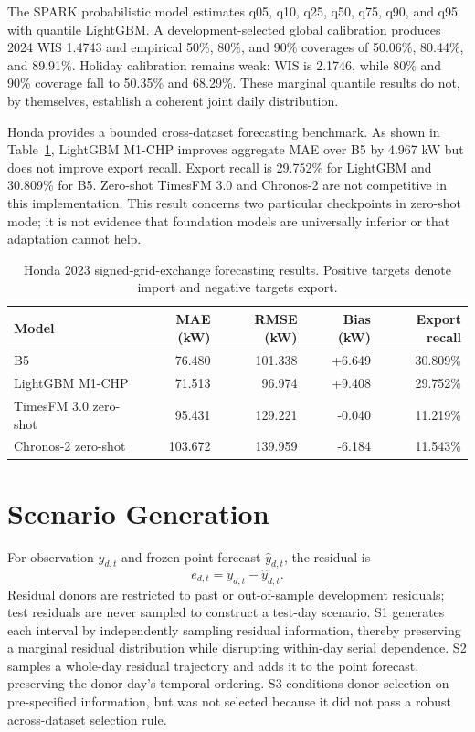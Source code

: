 \documentclass[10pt,twocolumn]{article}
\begin{document}
The SPARK probabilistic model estimates q05, q10, q25, q50, q75, q90, and q95
with quantile LightGBM. A development-selected global calibration produces 2024
WIS 1.4743 and empirical 50\%, 80\%, and 90\% coverages of 50.06\%, 80.44\%,
and 89.91\%. Holiday calibration remains weak: WIS is 2.1746, while 80\% and
90\% coverage fall to 50.35\% and 68.29\%. These marginal quantile results do
not, by themselves, establish a coherent joint daily distribution.

Honda provides a bounded cross-dataset forecasting benchmark. As shown in
Table~\ref{tab:honda-forecast}, LightGBM M1-CHP improves aggregate MAE over B5
by 4.967 kW but does not improve export recall. Export recall is 29.752\% for
LightGBM and 30.809\% for B5. Zero-shot TimesFM 3.0 and Chronos-2 are not
competitive in this implementation. This result concerns two particular
checkpoints in zero-shot mode; it is not evidence that foundation models are
universally inferior or that adaptation cannot help.

\begin{table}[t]
\centering
\caption{Honda 2023 signed-grid-exchange forecasting results. Positive targets
denote import and negative targets export.}
\label{tab:honda-forecast}
\small
\begin{tabular}{lrrrr}
\toprule
Model & MAE (kW) & RMSE (kW) & Bias (kW) & Export recall\\
\midrule
B5 & 76.480 & 101.338 & +6.649 & 30.809\%\\
LightGBM M1-CHP & 71.513 & 96.974 & +9.408 & 29.752\%\\
TimesFM 3.0 zero-shot & 95.431 & 129.221 & -0.040 & 11.219\%\\
Chronos-2 zero-shot & 103.672 & 139.959 & -6.184 & 11.543\%\\
\bottomrule
\end{tabular}
\end{table}

\section{Scenario Generation}
\label{sec:scenarios}

For observation $y_{d,t}$ and frozen point forecast $\widehat{y}_{d,t}$, the
residual is
\begin{equation}
  e_{d,t}=y_{d,t}-\widehat{y}_{d,t}.
\end{equation}
Residual donors are restricted to past or out-of-sample development residuals;
test residuals are never sampled to construct a test-day scenario. S1 generates
each interval by independently sampling residual information, thereby
preserving a marginal residual distribution while disrupting within-day serial
dependence. S2 samples a whole-day residual trajectory and adds it to the point
forecast, preserving the donor day's temporal ordering. S3 conditions donor
selection on pre-specified information, but was not selected because it did not
pass a robust across-dataset selection rule.
\end{document}
